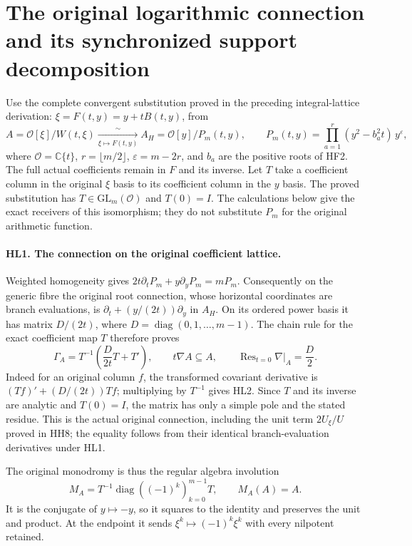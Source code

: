 \section{The original logarithmic connection and its synchronized support decomposition}
\label{sec:heat-lattice-receiver}

Use the complete convergent substitution proved in the preceding
integral-lattice derivation: $\xi=F(t,y)=y+tB(t,y)$, from
\[
 A=\mathcal O[\xi]/W(t,\xi)
       \xrightarrow[\xi\mapsto F(t,y)]{\ \sim\ }
 A_H=\mathcal O[y]/P_m(t,y),\qquad
 P_m(t,y)=\prod_{a=1}^r(y^2-b_a^2t)\,y^\varepsilon,
 \tag{HL1}
\]
where $\mathcal O=\mathbb C\{t\}$, $r=\lfloor m/2\rfloor$,
$\varepsilon=m-2r$, and $b_a$ are the positive roots of HF2.
The full actual coefficients remain in $F$ and its inverse.
Let $T$ take a coefficient column in the original $\xi$ basis to
its coefficient column in the $y$ basis. The proved substitution
has $T\in\mathrm{GL}_m(\mathcal O)$ and $T(0)=I$.
The calculations below give the exact receivers of this isomorphism;
they do not substitute $P_m$ for the original arithmetic function.

\paragraph{HL1. The connection on the original coefficient lattice.}
Weighted homogeneity gives
$2t\partial_tP_m+y\partial_yP_m=mP_m$.
Consequently on the generic fibre the original root connection,
whose horizontal coordinates are branch evaluations, is
$\partial_t+(y/(2t))\partial_y$ in $A_H$.
On its ordered power basis it has matrix
$D/(2t)$, where $D=\operatorname{diag}(0,1,\ldots,m-1)$.
The chain rule for the exact coefficient map $T$ therefore proves
\[
 \Gamma_A=T^{-1}\left(\frac{D}{2t}T+T'\right),
 \qquad t\nabla A\subseteq A,
 \qquad \operatorname{Res}_{t=0}\nabla\big|_A=\frac D2.
 \tag{HL2}
\]
Indeed for an original column $f$, the transformed covariant
derivative is $(Tf)'+(D/(2t))Tf$; multiplying by $T^{-1}$ gives
HL2. Since $T$ and its inverse are analytic and $T(0)=I$, the
matrix has only a simple pole and the stated residue.
This is the actual original connection, including the unit term
$2U_\xi/U$ proved in HH8; the equality follows from their identical
branch-evaluation derivatives under HL1.

The original monodromy is thus the regular algebra involution
\[
 M_A=T^{-1}\operatorname{diag}((-1)^k)_{k=0}^{m-1}T,
       \qquad M_A(A)=A.
 \tag{HL3}
\]
It is the conjugate of $y\mapsto-y$, so it squares to the identity
and preserves the unit and product. At the endpoint it sends
$\xi^k\mapsto(-1)^k\xi^k$ with every nilpotent retained.

